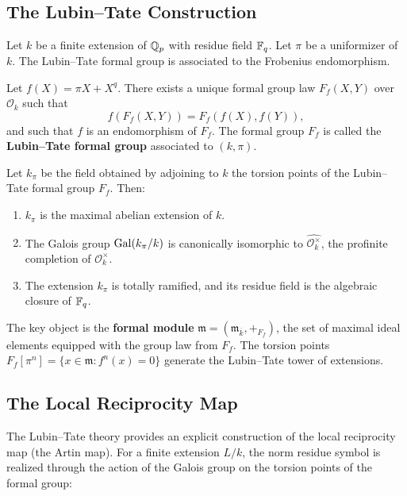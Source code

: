 \subsection{The Lubin--Tate Construction}

Let \(k\) be a finite extension of \(\mathbb{Q}_p\) with residue field \(\mathbb{F}_q\). Let \(\pi\) be a uniformizer of \(k\). The Lubin--Tate formal group is associated to the Frobenius endomorphism.

\begin{definition}
Let \(f(X) = \pi X + X^q\). There exists a unique formal group law \(F_f(X,Y)\) over \(\mathcal{O}_k\) such that
\[
f(F_f(X,Y)) = F_f(f(X), f(Y)),
\]
and such that \(f\) is an endomorphism of \(F_f\). The formal group \(F_f\) is called the \textbf{Lubin--Tate formal group} associated to \((k,\pi)\).
\end{definition}

\begin{theorem}
Let \(k_\pi\) be the field obtained by adjoining to \(k\) the torsion points of the Lubin--Tate formal group \(F_f\). Then:
\begin{enumerate}
    \item \(k_\pi\) is the maximal abelian extension of \(k\).
    \item The Galois group \(\operatorname{Gal}(k_\pi/k)\) is canonically isomorphic to \(\widehat{\mathcal{O}_k^\times}\), the profinite completion of \(\mathcal{O}_k^\times\).
    \item The extension \(k_\pi\) is totally ramified, and its residue field is the algebraic closure of \(\mathbb{F}_q\).
\end{enumerate}
\end{theorem}

The key object is the \textbf{formal module} \(\mathfrak{m} = (\mathfrak{m}_{\overline{k}}, +_{F_f})\), the set of maximal ideal elements equipped with the group law from \(F_f\). The torsion points \(F_f[\pi^n] = \{x \in \mathfrak{m} : f^n(x) = 0\}\) generate the Lubin--Tate tower of extensions.

\subsection{The Local Reciprocity Map}

The Lubin--Tate theory provides an explicit construction of the local reciprocity map (the Artin map). For a finite extension \(L/k\), the norm residue symbol is realized through the action of the Galois group on the torsion points of the formal group:

